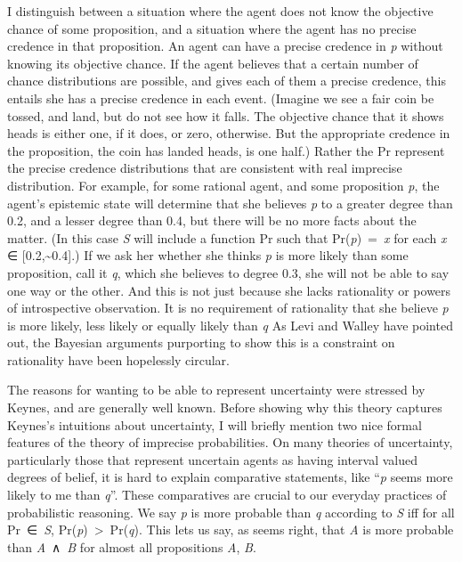 \documentclass[
  11pt,
  letterpaper,
  DIV=11,
  numbers=noendperiod,
  twoside]{scrartcl}
\begin{document}
I distinguish between a situation where the agent does not know the
objective chance of some proposition, and a situation where the agent
has no precise credence in that proposition. An agent can have a precise
credence in \emph{p} without knowing its objective chance. If the agent
believes that a certain number of chance distributions are possible, and
gives each of them a precise credence, this entails she has a precise
credence in each event. (Imagine we see a fair coin be tossed, and land,
but do not see how it falls. The objective chance that it shows heads is
either one, if it does, or zero, otherwise. But the appropriate credence
in the proposition, the coin has landed heads, is one half.) Rather the
Pr represent the precise credence distributions that are consistent with
real imprecise distribution. For example, for some rational agent, and
some proposition \emph{p}, the agent's epistemic state will determine
that she believes \emph{p} to a greater degree than 0.2, and a lesser
degree than 0.4, but there will be no more facts about the matter. (In
this case \emph{S} will include a function Pr such that
Pr(\emph{p})~=~\emph{x} for each \emph{x} ∈
{[}0.2,\textasciitilde0.4{]}.) If we ask her whether she thinks \emph{p}
is more likely than some proposition, call it \emph{q}, which she
believes to degree 0.3, she will not be able to say one way or the
other. And this is not just because she lacks rationality or powers of
introspective observation. It is no requirement of rationality that she
believe \emph{p} is more likely, less likely or equally likely than
\emph{q} As Levi and Walley have pointed out, the Bayesian arguments
purporting to show this is a constraint on rationality have been
hopelessly circular.

The reasons for wanting to be able to represent uncertainty were
stressed by Keynes, and are generally well known. Before showing why
this theory captures Keynes's intuitions about uncertainty, I will
briefly mention two nice formal features of the theory of imprecise
probabilities. On many theories of uncertainty, particularly those that
represent uncertain agents as having interval valued degrees of belief,
it is hard to explain comparative statements, like ``\emph{p} seems more
likely to me than \emph{q}''. These comparatives are crucial to our
everyday practices of probabilistic reasoning. We say \emph{p} is more
probable than \emph{q} according to \emph{S} iff for all Pr~∈~\emph{S},
Pr(\emph{p})~\textgreater~Pr(\emph{q}). This lets us say, as seems
right, that \emph{A} is more probable than \emph{A}~∧~\emph{B} for
almost all propositions \emph{A}, \emph{B}.
\end{document}
